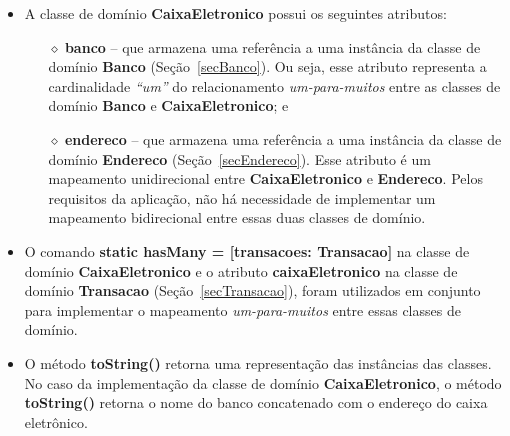 \begin{itemize}

\item A classe de domínio {\bf CaixaEletronico} possui os seguintes atributos: 

\vspace{0.5cm}

\begin{itemize}

\item[$\diamond$] {\bf banco} -- que  armazena uma referência a uma instância da
  classe de domínio {\bf  Banco} (Seção~\ref{secBanco}).  Ou seja, esse atributo
  representa a cardinalidade {\em ``um''} do relacionamento {\em um-para-muitos}
  entre as classes de domínio {\bf Banco} e {\bf CaixaEletronico}; e

\vspace{0.5cm}

\item[$\diamond$] {\bf endereco} -- que  armazena uma referência a uma instância
  da classe de domínio  {\bf Endereco} (Seção~\ref{secEndereco}).  Esse atributo
  é um  mapeamento unidirecional entre  {\bf CaixaEletronico} e  {\bf Endereco}.
  Pelos requisitos da aplicação, não há necessidade de implementar um mapeamento
  bidirecional entre essas duas classes de domínio.

\end{itemize}

\vspace{0.5cm}

\item  O comando {\bf  static hasMany  = [transacoes:  Transacao]} na  classe de
  domínio {\bf CaixaEletronico} e o  atributo {\bf caixaEletronico} na classe de
  domínio  {\bf  Transacao}   (Seção~\ref{secTransacao}),  foram  utilizados  em
  conjunto  para  implementar  o  mapeamento {\em  um-para-muitos}  entre  essas
  classes de domínio.

\vspace{0.5cm}

\item O  método {\bf  toString()} retorna uma  representação das  instâncias das
  classes.  No caso da implementação da classe de domínio {\bf CaixaEletronico},
  o método {\bf  toString()} retorna o nome do banco  concatenado com o endereço
  do caixa eletrônico.

\end{itemize}

\newpage

